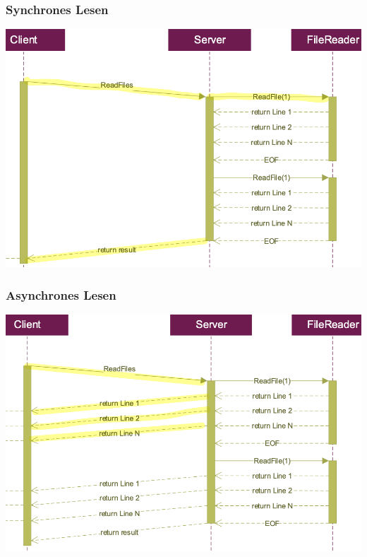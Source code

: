 \subsubsection{Synchrones Lesen}
\begin{center}
    \includegraphics[scale=.35]{graphic/gprc/Synchrones Lesen.png}
\end{center}
\vspace{-8pt}

\subsubsection{Asynchrones Lesen}
\begin{center}
    \includegraphics[scale=.35]{graphic/gprc/Asynchrones Lesen.png}
\end{center}
\vspace{-8pt}

